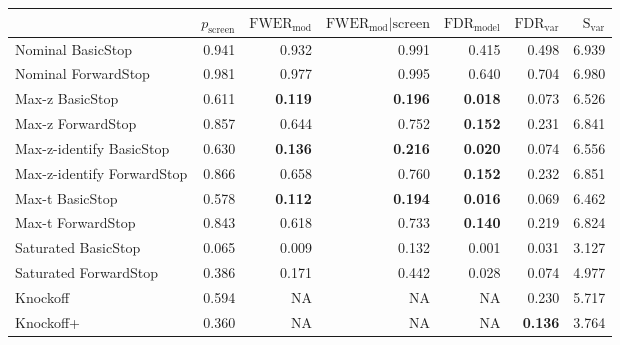 
\newcommand{\guarantee}[1]{{\bf #1}}
\begin{tabular}{|l|rrrrrr|}
 \hline
{} &  $p_{\text{screen}}$ &  $\text{FWER}_{\text{mod}}$ &  $\text{FWER}_{\text{mod}} \vert \text{screen}$ &  $\text{FDR}_{\text{model}}$ &  $\text{FDR}_{\text{var}}$ &  $\text{S}_{\text{var}}$ \\ \hline
Nominal BasicStop & 0.941 & 0.932 & 0.991 & 0.415 & 0.498 & 6.939 \\ 
Nominal ForwardStop & 0.981 & 0.977 & 0.995 & 0.640 & 0.704 & 6.980 \\ 
Max-z BasicStop & 0.611 & \guarantee{0.119} & \guarantee{0.196} & \guarantee{0.018} & 0.073 & 6.526 \\ 
Max-z ForwardStop & 0.857 & 0.644 & 0.752 & \guarantee{0.152} & 0.231 & 6.841 \\ 
Max-z-identify BasicStop & 0.630 & \guarantee{0.136} & \guarantee{0.216} & \guarantee{0.020} & 0.074 & 6.556 \\ 
Max-z-identify ForwardStop & 0.866 & 0.658 & 0.760 & \guarantee{0.152} & 0.232 & 6.851 \\ 
Max-t BasicStop & 0.578 & \guarantee{0.112} & \guarantee{0.194} & \guarantee{0.016} & 0.069 & 6.462 \\ 
Max-t ForwardStop & 0.843 & 0.618 & 0.733 & \guarantee{0.140} & 0.219 & 6.824 \\ 
Saturated BasicStop & 0.065 & 0.009 & 0.132 & 0.001 & 0.031 & 3.127 \\ 
Saturated ForwardStop & 0.386 & 0.171 & 0.442 & 0.028 & 0.074 & 4.977 \\ 
Knockoff & 0.594 & NA & NA & NA & 0.230 & 5.717 \\ 
Knockoff+ & 0.360 & NA & NA & NA & \guarantee{0.136} & 3.764 \\   \hline
\end{tabular}